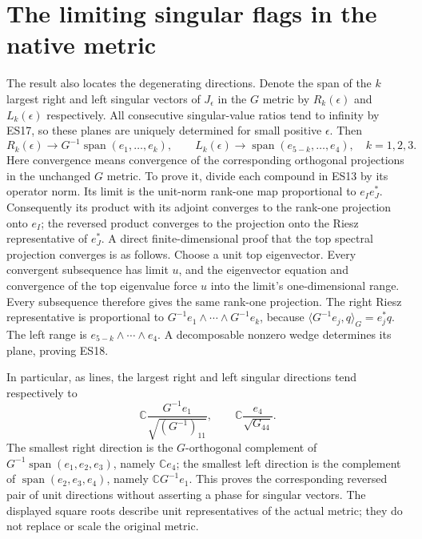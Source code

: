 \documentclass[11pt]{article}
\newcommand{\C}{\mathbb C}
\newcommand{\Span}{\operatorname{span}}
\begin{document}
\section{The limiting singular flags in the native metric}
The result also locates the degenerating directions. Denote the
span of the $k$ largest right and left singular vectors of
$J_\epsilon$ in the $G$ metric by $R_k(\epsilon)$ and
$L_k(\epsilon)$ respectively. All consecutive singular-value ratios
tend to infinity by ES17, so these planes are uniquely determined
for small positive $\epsilon$. Then
\[
 R_k(\epsilon)\longrightarrow G^{-1}\Span(e_1,\ldots,e_k),\qquad
 L_k(\epsilon)\longrightarrow\Span(e_{5-k},\ldots,e_4),
 \quad k=1,2,3.
 \tag{ES18}
\]
Here convergence means convergence of the corresponding orthogonal
projections in the unchanged $G$ metric. To prove it, divide each
compound in ES13 by its operator norm. Its limit is the unit-norm
rank-one map proportional to $e_Ie_J^*$. Consequently its product
with its adjoint converges to the rank-one projection onto $e_I$;
the reversed product converges to the projection onto the Riesz
representative of $e_J^*$. A direct finite-dimensional proof that
the top spectral projection converges is as follows. Choose a unit
top eigenvector. Every convergent subsequence has limit $u$, and
the eigenvector equation and convergence of the top eigenvalue
force $u$ into the limit's one-dimensional range. Every subsequence
therefore gives the same rank-one projection. The right Riesz
representative is proportional to
$G^{-1}e_1\wedge\cdots\wedge G^{-1}e_k$, because
$\langle G^{-1}e_j,q\rangle_G=e_j^*q$. The left range is
$e_{5-k}\wedge\cdots\wedge e_4$. A decomposable nonzero wedge
determines its plane, proving ES18.

In particular, as lines, the largest right and left singular
directions tend respectively to
\[
 \C\frac{G^{-1}e_1}{\sqrt{(G^{-1})_{11}}},\qquad
 \C\frac{e_4}{\sqrt{G_{44}}}.
 \tag{ES19}
\]
The smallest right direction is the $G$-orthogonal complement of
$G^{-1}\Span(e_1,e_2,e_3)$, namely $\C e_4$; the smallest left
direction is the complement of $\Span(e_2,e_3,e_4)$, namely
$\C G^{-1}e_1$. This proves the corresponding reversed pair of
unit directions without asserting a phase for singular vectors.
The displayed square roots describe unit representatives of the
actual metric; they do not replace or scale the original metric.
\end{document}
